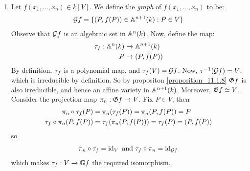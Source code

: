 \begin{example}
\begin{enumerate}
    \item[(2)] Let $f(x_1, \dots, x_n) \in k[V]$. We define the
      \textit{graph} of $f(x_1, \dots, x_n)$ to be:
      \begin{equation*}
        \mathcal{G}{f}=\{(P, f(P)) \in \mathbb{A}^{n+1}(k) : P \in V\}
      \end{equation*}
      Observe that $\mathcal{G}{f}$ is an algebraic set in $\mathbb{A}^n(k)$. Now, define
      the map:
      \begin{equation*}
        \begin{split}
          \tau_f:\mathbb{A}^n(k) &  \xrightarrow{} \mathbb{A}^{n+1}(k)  \\
          P &  \xrightarrow{} (P,f(P))
        \end{split}
      \end{equation*}
      By definition, $\tau_f$ is a polynomial map, and
      $\tau_f(V)=\mathcal{G}{f}$. Now, $\tau^{-1}(\mathcal{G}{f})=V$, which is
      irreducible by definition. So by propositon
      \ref{proposition_11.1.8} $\mathfrak{G}{f}$ is also irreducible, and
      hence an affine variety in $\mathbb{A}^{n+1}(k)$. Moreover, $\mathfrak{G}{f}
      \simeq V$. Consider the projection map $\pi_n:\mathfrak{G}{f}
      \xrightarrow{} V$. Fix $P \in V$, then
      \begin{equation*}
        \begin{split}
          \pi_n \circ \tau_f(P) &=  \pi_n(\tau_f(P))=\pi_n(P,f(P))=P  \\
          \tau_f \circ \pi_n(P,f(P))  &=  \tau_f(\pi_n(P,f(P)))=
                                \tau_f(P)=(P,f(P))  \\
        \end{split}
      \end{equation*}
      so
      \begin{equation*}
        \pi_n \circ \tau_f=\operatorname{id}_V \text{ and } \tau_f \circ \pi_n=\operatorname{id}_{\mathcal{G}{f}}
      \end{equation*}
      which makes $\tau_f:V \xrightarrow{} \mathbb{G}{f}$ the required
      isomorphism.
  \end{enumerate}
\end{example}

